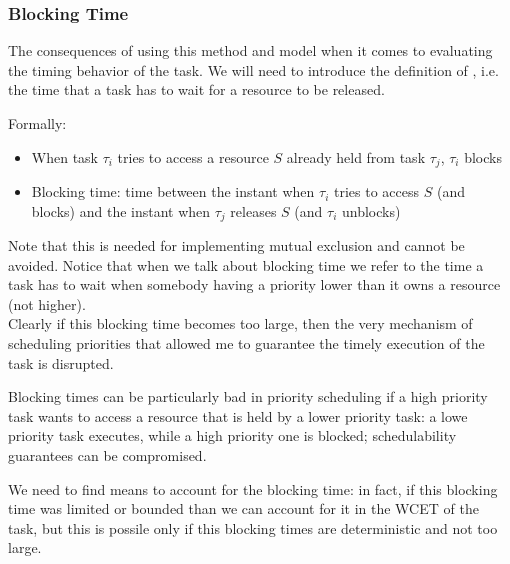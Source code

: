 \subsubsection{Blocking Time}
The consequences of using this method and model when it comes to evaluating the timing behavior of the task.
We will need to introduce the definition of , i.e. the time that a task has to wait for a resource to be released.

Formally:
\begin{itemize}
\item When task $\tau_i$ tries to access a resource $S$ already held from task $\tau_j$, $\tau_i$ blocks
\item Blocking time: time between the instant when $\tau_i$ tries to access $S$ (and blocks) and the instant when $\tau_j$ releases $S$ (and $\tau_i$ unblocks)
\end{itemize}

Note that this is needed for implementing mutual exclusion and cannot be avoided. Notice that when we talk about blocking time we refer to the time a task has to wait when somebody having a priority lower than it owns a resource (not higher).\\
Clearly if this blocking time becomes too large, then the very mechanism of scheduling priorities that allowed me to guarantee the timely execution of the task is disrupted.

Blocking times can be particularly bad in priority scheduling if a high priority task wants to access a resource that is held by a lower priority task: a lowe priority task executes, while a high priority one is blocked; schedulability guarantees can be compromised.


We need to find means to account for the blocking time: in fact, if this blocking time was limited or bounded than we can account for it in the WCET of the task, but this is possile only if this blocking times are deterministic and not too large.


